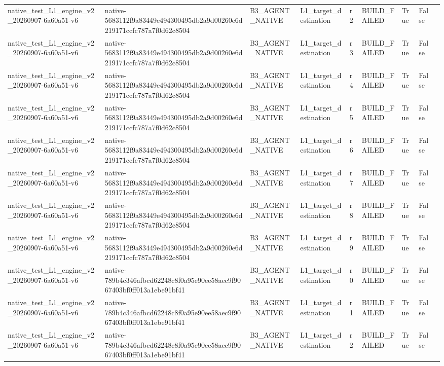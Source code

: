 \begin{tabular}{lllllllll}
native\_test\_L1\_engine\_v2\_20260907-6a60a51-v6 & native-5683112f9a83449e494300495db2a9d00260e6d219171ccfc787a7f0d62c8504 & B3\_AGENT\_NATIVE & L1\_target\_destination & r2 & BUILD\_FAILED & True & False &  \\
native\_test\_L1\_engine\_v2\_20260907-6a60a51-v6 & native-5683112f9a83449e494300495db2a9d00260e6d219171ccfc787a7f0d62c8504 & B3\_AGENT\_NATIVE & L1\_target\_destination & r3 & BUILD\_FAILED & True & False &  \\
native\_test\_L1\_engine\_v2\_20260907-6a60a51-v6 & native-5683112f9a83449e494300495db2a9d00260e6d219171ccfc787a7f0d62c8504 & B3\_AGENT\_NATIVE & L1\_target\_destination & r4 & BUILD\_FAILED & True & False &  \\
native\_test\_L1\_engine\_v2\_20260907-6a60a51-v6 & native-5683112f9a83449e494300495db2a9d00260e6d219171ccfc787a7f0d62c8504 & B3\_AGENT\_NATIVE & L1\_target\_destination & r5 & BUILD\_FAILED & True & False &  \\
native\_test\_L1\_engine\_v2\_20260907-6a60a51-v6 & native-5683112f9a83449e494300495db2a9d00260e6d219171ccfc787a7f0d62c8504 & B3\_AGENT\_NATIVE & L1\_target\_destination & r6 & BUILD\_FAILED & True & False &  \\
native\_test\_L1\_engine\_v2\_20260907-6a60a51-v6 & native-5683112f9a83449e494300495db2a9d00260e6d219171ccfc787a7f0d62c8504 & B3\_AGENT\_NATIVE & L1\_target\_destination & r7 & BUILD\_FAILED & True & False &  \\
native\_test\_L1\_engine\_v2\_20260907-6a60a51-v6 & native-5683112f9a83449e494300495db2a9d00260e6d219171ccfc787a7f0d62c8504 & B3\_AGENT\_NATIVE & L1\_target\_destination & r8 & BUILD\_FAILED & True & False &  \\
native\_test\_L1\_engine\_v2\_20260907-6a60a51-v6 & native-5683112f9a83449e494300495db2a9d00260e6d219171ccfc787a7f0d62c8504 & B3\_AGENT\_NATIVE & L1\_target\_destination & r9 & BUILD\_FAILED & True & False &  \\
native\_test\_L1\_engine\_v2\_20260907-6a60a51-v6 & native-789b4c346afbcd62248c8f0a95e90ee58aec9f9067403bf0ff013a1ebe91bf41 & B3\_AGENT\_NATIVE & L1\_target\_destination & r0 & BUILD\_FAILED & True & False &  \\
native\_test\_L1\_engine\_v2\_20260907-6a60a51-v6 & native-789b4c346afbcd62248c8f0a95e90ee58aec9f9067403bf0ff013a1ebe91bf41 & B3\_AGENT\_NATIVE & L1\_target\_destination & r1 & BUILD\_FAILED & True & False &  \\
native\_test\_L1\_engine\_v2\_20260907-6a60a51-v6 & native-789b4c346afbcd62248c8f0a95e90ee58aec9f9067403bf0ff013a1ebe91bf41 & B3\_AGENT\_NATIVE & L1\_target\_destination & r2 & BUILD\_FAILED & True & False &  \\

\end{tabular}
